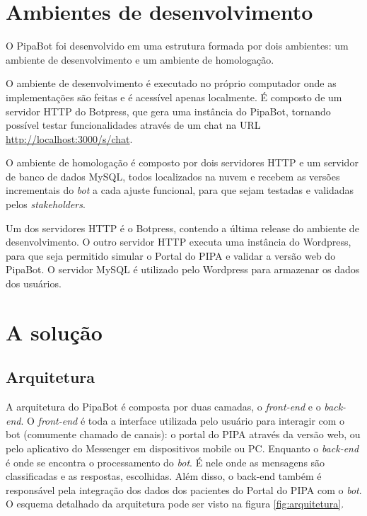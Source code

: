   

  \section{Ambientes de desenvolvimento} %
  O PipaBot foi desenvolvido em uma estrutura formada por dois ambientes: um ambiente de desenvolvimento e um ambiente de homologação.
  
  O ambiente de desenvolvimento é executado no próprio computador onde as implementações são feitas e é acessível apenas localmente. É composto de um servidor HTTP do Botpress, que gera uma instância do PipaBot, tornando possível testar funcionalidades através de um chat na URL \url{http://localhost:3000/s/chat}.
  
  O ambiente de homologação é composto por dois servidores HTTP e um servidor de banco de dados MySQL, todos localizados na nuvem e recebem as versões incrementais do \textit{bot} a cada ajuste funcional, para que sejam testadas e validadas pelos \textit{stakeholders}.
  
  Um dos servidores HTTP é o Botpress, contendo a última release do ambiente de desenvolvimento. O outro servidor HTTP executa uma instância do Wordpress, para que seja permitido simular o Portal do PIPA e validar a versão web do PipaBot. O servidor MySQL é utilizado pelo Wordpress para armazenar os dados dos usuários.
  
  \section{A solução}
  
  \subsection{Arquitetura}
  A arquitetura do PipaBot é composta por duas camadas, o \textit{front-end} e o \textit{back-end}. O \textit{front-end} é toda a interface utilizada pelo usuário para interagir com o bot (comumente chamado de canais): o portal do PIPA através da versão web, ou pelo aplicativo do Messenger em dispositivos mobile ou PC. Enquanto o \textit{back-end} é onde se encontra o processamento do \textit{bot}. É nele onde as mensagens são classificadas e as respostas, escolhidas. Além disso, o back-end também é responsável pela integração dos dados dos pacientes do Portal do PIPA com o \textit{bot}. O esquema detalhado da arquitetura pode ser visto na figura \ref{fig:arquitetura}.
  

